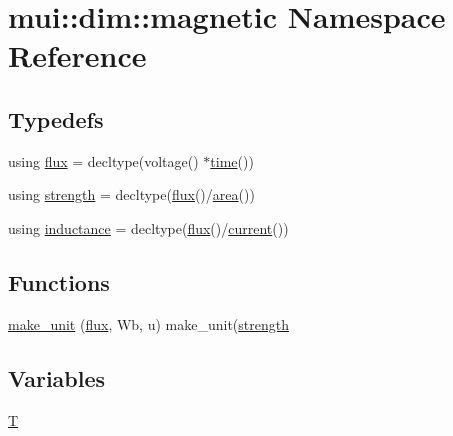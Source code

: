 \hypertarget{namespacemui_1_1dim_1_1magnetic}{}\section{mui\+:\+:dim\+:\+:magnetic Namespace Reference}
\label{namespacemui_1_1dim_1_1magnetic}
\subsection*{Typedefs}
\begin{DoxyCompactItemize}
\item 
using \hyperlink{namespacemui_1_1dim_1_1magnetic_af16e4663d0ff988de3b2e2ea62fe35cc}{flux} = decltype(voltage() $\ast$\hyperlink{namespacemui_1_1dim_a3d3a0014025f1c2c0dd7418791928500}{time}())
\item 
using \hyperlink{namespacemui_1_1dim_1_1magnetic_a5a54ca4833f22cac4441e18b35f62ff1}{strength} = decltype(\hyperlink{namespacemui_1_1dim_1_1magnetic_af16e4663d0ff988de3b2e2ea62fe35cc}{flux}()/\hyperlink{namespacemui_1_1dim_aedf0a30e04c732a032fe7e04d3260ee3}{area}())
\item 
using \hyperlink{namespacemui_1_1dim_1_1magnetic_a0d41d1b2364f965eb0078959838b81fb}{inductance} = decltype(\hyperlink{namespacemui_1_1dim_1_1magnetic_af16e4663d0ff988de3b2e2ea62fe35cc}{flux}()/\hyperlink{namespacemui_1_1dim_ac15a72100f3e57d6c9419fca5501b456}{current}())
\end{DoxyCompactItemize}
\subsection*{Functions}
\begin{DoxyCompactItemize}
\item 
\hyperlink{namespacemui_1_1dim_1_1magnetic_a476b630da1c8182a9e3fc97ab6407763}{make\+\_\+unit} (\hyperlink{namespacemui_1_1dim_1_1magnetic_af16e4663d0ff988de3b2e2ea62fe35cc}{flux}, Wb, u) make\+\_\+unit(\hyperlink{namespacemui_1_1dim_1_1magnetic_a5a54ca4833f22cac4441e18b35f62ff1}{strength}
\end{DoxyCompactItemize}
\subsection*{Variables}
\begin{DoxyCompactItemize}
\item 
\hyperlink{namespacemui_1_1dim_1_1magnetic_a096e4445368349b6ee972688bd4cf705}{T}
\end{DoxyCompactItemize}


